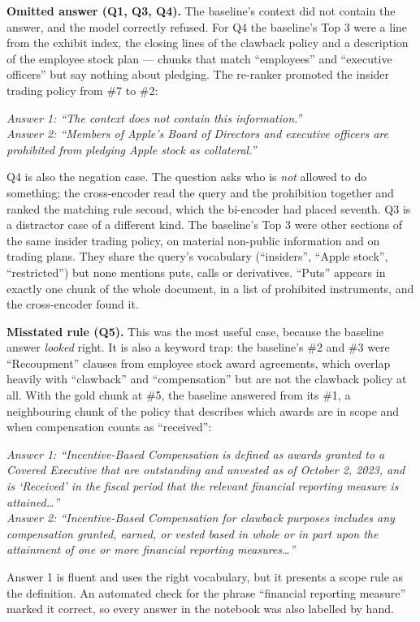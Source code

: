 \documentclass[10pt,a4paper]{article}
\newcommand{\ans}[1]{\par\smallskip\noindent\hspace*{1.2em}\begin{minipage}{0.94\linewidth}\small\itshape #1\end{minipage}\par\smallskip}
\begin{document}
\textbf{Omitted answer (Q1, Q3, Q4).} The baseline's context did not contain the answer, and
the model correctly refused. For Q4 the baseline's Top 3 were a line from the exhibit index,
the closing lines of the clawback policy and a description of the employee stock plan ---
chunks that match ``employees'' and ``executive officers'' but say nothing about pledging.
The re-ranker promoted the insider trading policy from \#7 to \#2:
\ans{Answer 1: ``The context does not contain this information.''\\[2pt]
Answer 2: ``Members of Apple's Board of Directors and executive officers are prohibited from
pledging Apple stock as collateral.''}
Q4 is also the negation case. The question asks who is \emph{not} allowed to do something;
the cross-encoder read the query and the prohibition together and ranked the matching rule
second, which the bi-encoder had placed seventh. Q3 is a distractor case of a different kind. The baseline's Top 3 were
other sections of the same insider trading policy, on material non-public information and
on trading plans. They share the query's vocabulary (``insiders'', ``Apple stock'',
``restricted'') but none mentions puts, calls or derivatives. ``Puts'' appears in exactly one
chunk of the whole document, in a list of prohibited instruments, and the cross-encoder found
it.

\textbf{Misstated rule (Q5).} This was the most useful case, because the baseline answer
\emph{looked} right. It is also a keyword trap: the baseline's \#2 and \#3 were ``Recoupment''
clauses from employee stock award agreements, which overlap heavily with ``clawback'' and
``compensation'' but are not the clawback policy at all. With the gold chunk at \#5, the
baseline answered from its \#1, a neighbouring chunk of the policy that describes which
awards are in scope and when compensation counts as ``received'':
\ans{Answer 1: ``Incentive-Based Compensation is defined as awards granted to a Covered
Executive that are outstanding and unvested as of October 2, 2023, and is `Received' in the
fiscal period that the relevant financial reporting measure is attained\ldots''\\[2pt]
Answer 2: ``Incentive-Based Compensation for clawback purposes includes any compensation
granted, earned, or vested based in whole or in part upon the attainment of one or more
financial reporting measures\ldots''}
Answer 1 is fluent and uses the right vocabulary, but it presents a scope rule as the
definition. An automated check for the phrase ``financial reporting measure'' marked it
correct, so every answer in the notebook was also labelled by hand.
\end{document}
